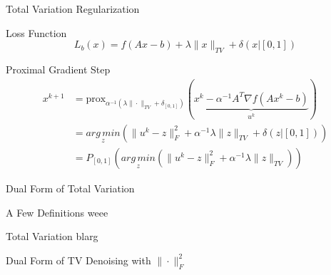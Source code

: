 \documentclass[12pt]{beamer}
\newcommand{\AMz}{\underset{z}{arg\, min}}
\newcommand{\prox}{\text{prox}}
\begin{document}
\begin{frame}{Total Variation Regularization}

\begin{exampleblock}{Loss Function}
$$
L_b(x) = f(Ax-b) + \lambda \|x\|_{TV} + \delta(x | [0,1])
$$
\end{exampleblock}

\begin{exampleblock}{Proximal Gradient Step}
\begin{align*}
x^{k+1} &= \prox_{\alpha^{-1}(\lambda \|\cdot \|_{TV} + \delta_{[0,1]})} (\underbrace{x^k - \alpha^{-1} A^T\nabla f (Ax^k - b)}_{u^k}) \\
&= \AMz \left( \|u^k - z\|_F^2 + \alpha^{-1}\lambda \|z\|_{TV} + \delta(z | [0,1]) \right) \\
&= P_{[0,1]}  \left( \AMz \left( \|u^k - z\|_F^2 + \alpha^{-1}\lambda \|z\|_{TV} \right) \right)
\end{align*}
\end{exampleblock}

\end{frame}

\begin{frame}{Dual Form of Total Variation}

\begin{exampleblock}{A Few Definitions}
weee
\end{exampleblock}

\begin{exampleblock}{Total Variation}
blarg
\end{exampleblock}

\end{frame}

\begin{frame}{Dual Form of TV Denoising with $\|\cdot \|_F^2$}

\end{frame}
\end{document}

